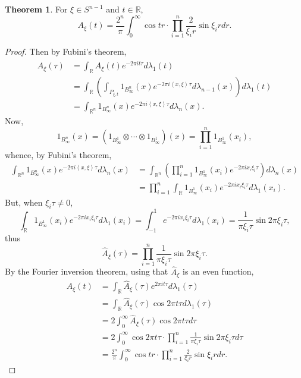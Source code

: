 \documentclass{article}
\newcommand{\inner}[2]{\left\langle #1, #2 \right\rangle}
\theoremstyle{definition}
\newtheorem{theorem}{Theorem}
\theoremstyle{definition}
\begin{document}
\begin{theorem}
For $\xi \in S^{n-1}$ and $t \in \mathbb{R}$,
\[
A_\xi(t) = \frac{2^n}{\pi} \int_0^\infty \cos tr \cdot \prod_{i=1}^n \frac{2}{\xi_i r} \sin \xi_i r dr.
\]
\end{theorem}
\begin{proof}
Then by Fubini's theorem,
\begin{align*}
\widehat{A}_\xi(\tau) &= \int_{\mathbb{R}} A_\xi(t) e^{-2\pi it\tau} d\lambda_1(t)\\
&=\int_{\mathbb{R}} \left(\int_{P_{\xi,t}} 1_{B_\infty^n}(x) e^{-2\pi i\inner{x}{\xi} \tau}  d\lambda_{n-1}(x)\right) 
d\lambda_1(t)\\
&=\int_{\mathbb{R}^n} 1_{B_\infty^n}(x) e^{-2\pi i\inner{x}{\xi}\tau} d\lambda_n(x).
\end{align*}
Now, 
\[
1_{B_\infty^n}(x) = (1_{B_\infty^1} \otimes \cdots \otimes 1_{B_\infty^1})(x)
=\prod_{i=1}^n 1_{B_\infty^1}(x_i),
\]
whence, by Fubini's theorem,
\begin{align*}
\int_{\mathbb{R}^n} 1_{B_\infty^n}(x) e^{-2\pi i\inner{x}{\xi}\tau} d\lambda_n(x)&=
\int_{\mathbb{R}^n} \left(\prod_{i=1}^n 1_{B_\infty^1}(x_i) e^{-2\pi i x_i \xi_i \tau}\right) d\lambda_n(x)\\
&=\prod_{i=1}^n \int_{\mathbb{R}} 1_{B_\infty^1}(x_i) e^{-2\pi i x_i \xi_i \tau} d\lambda_1(x_i).
\end{align*}
But, when $\xi_i \tau \neq 0$,
\[
\int_{\mathbb{R}} 1_{B_\infty^1}(x_i) e^{-2\pi i x_i \xi_i \tau} d\lambda_1(x_i)
=\int_{-1}^1 
 e^{-2\pi i x_i \xi_i \tau} d\lambda_1(x_i)
 =\frac{1}{\pi \xi_i \tau} \sin 2\pi \xi_i \tau,
\]
thus
\[
\widehat{A}_\xi(\tau) = \prod_{i=1}^n \frac{1}{\pi \xi_i \tau} \sin 2\pi \xi_i \tau.
\]
By the Fourier inversion theorem, using that $\widehat{A}_\xi$ is an even function,
\begin{align*}
A_\xi(t) &= \int_{\mathbb{R}} \widehat{A}_\xi(\tau) e^{2\pi it\tau} d\lambda_1(\tau)\\
&=\int_{\mathbb{R}}  \widehat{A}_\xi(\tau) \cos 2\pi t \tau d\lambda_1(\tau)\\
&=2 \int_0^\infty  \widehat{A}_\xi(\tau) \cos 2\pi t \tau d\tau\\
&=2 \int_0^\infty  \cos 2\pi t \tau \cdot \prod_{i=1}^n \frac{1}{\pi \xi_i \tau} \sin 2\pi \xi_i \tau d\tau\\
&=\frac{2^n}{\pi} \int_0^\infty \cos tr \cdot \prod_{i=1}^n \frac{2}{\xi_i r} \sin \xi_i r dr.
\end{align*}
\end{proof}
\end{document}
